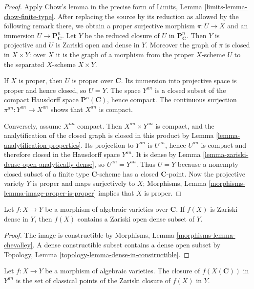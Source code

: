 \begin{proof}
Apply Chow's lemma in the precise form of Limits, Lemma
\ref{limits-lemma-chow-finite-type}. After replacing the source by its
reduction as allowed by the following remark there, we obtain a proper
surjective morphism $\pi : U \to X$ and an immersion
$U \to \mathbf P^n_{\mathbf C}$. Let $Y$ be the reduced closure of $U$ in
$\mathbf P^n_{\mathbf C}$. Then $Y$ is projective and $U$ is Zariski open
and dense in $Y$. Moreover the graph of $\pi$ is closed in $X\times Y$:
over $X$ it is the graph of a morphism from the proper $X$-scheme $U$ to the
separated $X$-scheme $X\times Y$.

If $X$ is proper, then $U$ is proper over $\mathbf C$. Its immersion into
projective space is proper and hence closed, so $U=Y$. The space
$Y^{an}$ is a closed subset of the compact Hausdorff space
$\mathbf P^n(\mathbf C)$, hence compact. The continuous surjection
$\pi^{an}:Y^{an}\to X^{an}$ shows that $X^{an}$ is compact.

Conversely, assume $X^{an}$ compact. Then $X^{an}\times Y^{an}$ is compact,
and the analytification of the closed graph is closed in this product by
Lemma \ref{lemma-analytification-properties}. Its projection to $Y^{an}$ is
$U^{an}$, hence $U^{an}$ is compact and therefore closed in the Hausdorff
space $Y^{an}$. It is dense by
Lemma \ref{lemma-zariski-dense-open-analytically-dense}, so $U^{an}=Y^{an}$.
Thus $U=Y$ because a nonempty closed subset of a finite type
$\mathbf C$-scheme has a closed $\mathbf C$-point. Now the projective variety
$Y$ is proper and maps surjectively to $X$; Morphisms, Lemma
\ref{morphisms-lemma-image-proper-is-proper} implies that $X$ is proper.
\end{proof}

\begin{lemma}
\label{lemma-dense-image-contains-open}
Let $f : X \to Y$ be a morphism of algebraic varieties over $\mathbf C$. If
$f(X)$ is Zariski dense in $Y$, then $f(X)$ contains a Zariski open dense
subset of $Y$.
\end{lemma}

\begin{proof}
The image is constructible by Morphisms, Lemma
\ref{morphisms-lemma-chevalley}. A dense constructible subset contains a dense
open subset by Topology, Lemma
\ref{topology-lemma-dense-in-constructible}.
\end{proof}

\begin{proposition}
\label{proposition-image-closure}
Let $f : X \to Y$ be a morphism of algebraic varieties. The closure of
$f(X(\mathbf C))$ in $Y^{an}$ is the set of classical points of the Zariski
closure of $f(X)$ in $Y$.
\end{proposition}

